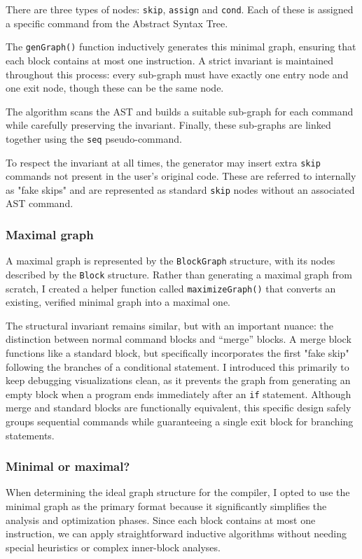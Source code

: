 \documentclass[12pt]{article}
\newcommand{\Code}[1]{\texttt{#1}}
\begin{document}
There are three types of nodes: \Code{skip}, \Code{assign} and \Code{cond}. Each
of these is assigned a specific command from the Abstract Syntax Tree.

The \Code{genGraph()} function inductively generates this minimal graph,
ensuring that each block contains at most one instruction. A strict invariant is
maintained throughout this process: every sub-graph must have exactly one entry
node and one exit node, though these can be the same node.

The algorithm scans the AST and builds a suitable sub-graph for each command
while carefully preserving the invariant. Finally, these sub-graphs are linked
together using the \texttt{seq} pseudo-command.

To respect the invariant at all times, the generator may insert extra
\texttt{skip} commands not present in the user's original code. These are
referred to internally as "fake skips" and are represented as standard
\texttt{skip} nodes without an associated AST command.

\subsubsection{Maximal graph}

A maximal graph is represented by the \Code{BlockGraph} structure, with its
nodes described by the \Code{Block} structure. Rather than generating a maximal
graph from scratch, I created a helper function called \Code{maximizeGraph()}
that converts an existing, verified minimal graph into a maximal one.

The structural invariant remains similar, but with an important nuance: the
distinction between normal command blocks and ``merge'' blocks. A merge block
functions like a standard block, but specifically incorporates the first "fake
skip" following the branches of a conditional statement. I introduced this
primarily to keep debugging visualizations clean, as it prevents the graph from
generating an empty block when a program ends immediately after an \texttt{if}
statement. Although merge and standard blocks are functionally equivalent, this
specific design safely groups sequential commands while guaranteeing a single
exit block for branching statements.

\subsubsection{Minimal or maximal?}

When determining the ideal graph structure for the compiler, I opted to use the
minimal graph as the primary format because it significantly simplifies the
analysis and optimization phases. Since each block contains at most one
instruction, we can apply straightforward inductive algorithms without needing
special heuristics or complex inner-block analyses.
\end{document}
